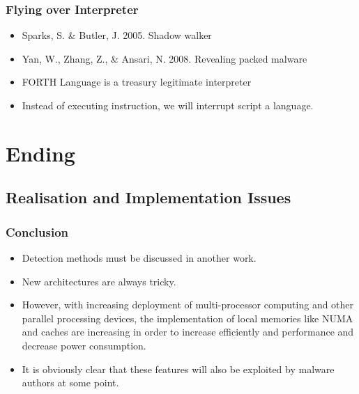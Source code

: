 \documentclass{beamer}
\begin{document}
\begin{frame}
	\frametitle{Flying over Interpreter}
	\begin{itemize}
		\item Sparks, S. \& Butler, J. 2005. Shadow walker
		\item Yan, W., Zhang, Z., \& Ansari, N. 2008. Revealing packed malware
		\item FORTH Language is a treasury legitimate interpreter
		\item Instead of executing instruction, we will interrupt script a language.
	\end{itemize}
\end{frame}









\section{Ending}
	\subsection{Realisation and Implementation Issues}





\begin{frame}
	\frametitle{Conclusion}
	\begin{itemize}
		\item Detection methods must be discussed in another work.
		\item New architectures are always tricky.
		\item However, with increasing deployment of multi-processor computing and other parallel processing devices, the implementation of local memories like NUMA and caches are increasing in order to increase efficiently and performance and decrease power consumption. 
		\item It is obviously clear that these features will also be exploited by malware authors at some point. 
	\end{itemize}
\end{frame}

\end{document}
